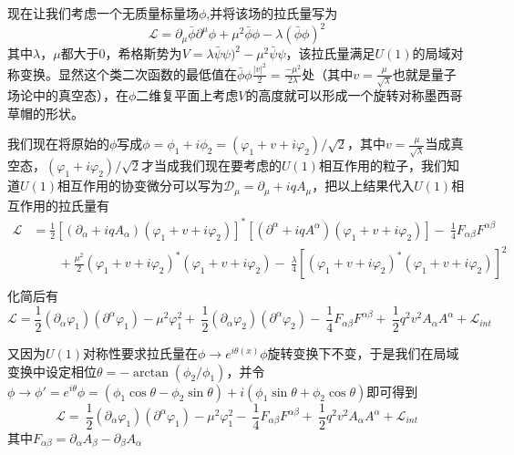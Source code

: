 现在让我们考虑一个无质量标量场$\phi$,并将该场的拉氏量写为
\begin{equation}\label{eq:1.1}
    \mathcal{L}=\partial_{\mu}\bar{\phi}\partial^{\mu} \phi+\mu^2\bar{\phi}\phi -\lambda(\bar{\phi}\phi)^2
\end{equation}
其中$\lambda$，$\mu$都大于0，希格斯势为$V=\lambda\bar{\psi}\psi)^2-\mu^2\bar{\psi}\psi$，该拉氏量满足$U(1)$的局域对称变换。显然这个类二次函数的最低值在$\bar{\phi}\phi\frac{|v|^2}{2}=\frac{-\mu^2}{2\lambda}$处（其中$v=\frac{\mu}{\sqrt{\lambda}}$也就是量子场论中的真空态），在$\phi$二维复平面上考虑$V$的高度就可以形成一个旋转对称墨西哥草帽的形状。

我们现在将原始的$\phi$写成$\phi=\phi_1+i\phi_2=(\varphi_1+v+i\varphi_2)/\sqrt{2}$，其中$v=\frac{\mu}{\sqrt{\lambda}}$当成真空态，$(\varphi_1+i\varphi_2)/\sqrt{2}$才当成我们现在要考虑的$U(1)$相互作用的粒子，我们知道$U(1)$相互作用的协变微分可以写为$\mathcal{D}_\mu=\partial_{\mu}+iqA_{\mu}$，把以上结果代入$U(1)$相互作用的拉氏量有
\begin{equation}
\begin{aligned}\mathcal{L} & =\frac{1}{2}[(\partial_{\alpha}+iqA_{\alpha})(\varphi_1+v+i\varphi_2)]^*
[(\partial^{\alpha}+iqA^{\alpha})(\varphi_1+v+i\varphi_2)]
-\ \frac{1}{4}F_{\alpha\beta}F^{\alpha\beta} \\
 & \qquad+\frac{\mu^2}{2}(\varphi_1+v+i\varphi_2)^*(\varphi_1+v+i\varphi_2)
-\ \frac{\lambda}{4}[(\varphi_1+v+i\varphi_2)^*(\varphi_1+v+i\varphi_2)]^2 \\
\end{aligned}
\end{equation}
化简后有
\begin{equation}
    \mathcal{L}=\frac{1}{2}(\partial_{\alpha}\varphi_1)(\partial^{\alpha}\varphi_1)
-\mu^2\varphi_1^2+\ \frac{1}{2}(\partial_{\alpha}\varphi_2)(\partial^{\alpha}\varphi_2)-\ \frac{1}{4}F_{\alpha\beta}F^{\alpha\beta} +\ \frac{1}{2}q^2 v^2 A_{\alpha}A^{\alpha}+ \mathcal{L}_{int}
\end{equation}

又因为$U(1)$对称性要求拉氏量在$\phi\to e^{i\theta(x)}\phi$旋转变换下不变，于是我们在局域变换中设定相位$\theta=-\arctan{(\phi_2/\phi_1)}$，并令$\phi\to \phi'=e^{i\theta}\phi=(\phi_1\cos{\theta}-\phi_2\sin{\theta})
+i(\phi_1\sin{\theta}+\phi_2\cos{\theta})$即可得到
\begin{equation}
    \mathcal{L}=\ \frac{1}{2} (\partial_{\alpha}\varphi_1)(\partial^{\alpha}\varphi_1) 
-\mu^2\varphi_1^2  -\ \frac{1}{4}F_{\alpha\beta}F^{\alpha\beta} +\ \frac{1}{2}q^2 v^2 A_{\alpha}A^{\alpha} +\mathcal{L}_{int}
\end{equation}
其中$F_{\alpha\beta}=\partial_\alpha A_\beta-\partial_\beta A_\alpha$

